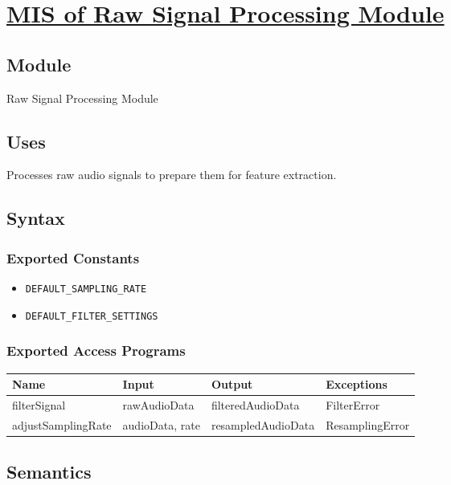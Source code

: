 \documentclass[12pt, titlepage]{article}
\begin{document}
\section{\hyperref[mRSM]{MIS of Raw Signal Processing Module}} \label{M4}  

\subsection{Module}  
Raw Signal Processing Module  

\subsection{Uses}  
Processes raw audio signals to prepare them for feature extraction.  

\subsection{Syntax}  

\subsubsection{Exported Constants}  
\begin{itemize}
    \item \texttt{DEFAULT\_SAMPLING\_RATE}  
    \item \texttt{DEFAULT\_FILTER\_SETTINGS}  
\end{itemize}  

\subsubsection{Exported Access Programs}  
\begin{center}  
\begin{tabular}{|p{4cm}|p{3cm}|p{4cm}|p{3.5cm}|}  
\hline  
\textbf{Name} & \textbf{Input} & \textbf{Output} & \textbf{Exceptions} \\  
\hline  
filterSignal & rawAudioData & filteredAudioData & FilterError \\  
adjustSamplingRate & audioData, rate & resampledAudioData & ResamplingError \\  
\hline  
\end{tabular}  
\end{center}  

\subsection{Semantics}  
\end{document}
